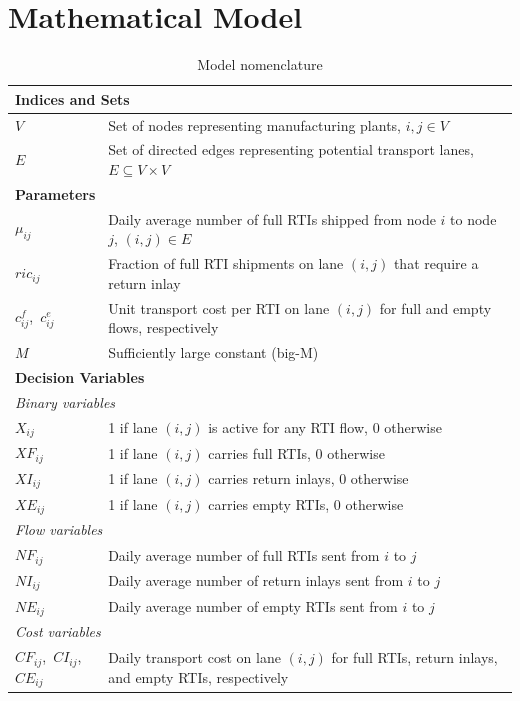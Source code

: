 
\section{Mathematical Model}

\begin{longtable}{|p{}|p{}|}
\caption{Model nomenclature}
\label{tab:nomenclature}\\
\hline
\multicolumn{2}{|l|}{\textbf{Indices and Sets}}\\ \hline
$V$ & Set of nodes representing manufacturing plants, $i, j \in V$ \\
$E$ & Set of directed edges representing potential transport lanes,
      $E \subseteq V \times V$ \\
\hline
\multicolumn{2}{|l|}{\textbf{Parameters}}\\ \hline
$\mu_{ij}$     & Daily average number of full RTIs shipped from node $i$
                 to node $j$, $(i,j)\in E$ \\
$ric_{ij}$     & Fraction of full RTI shipments on lane $(i,j)$ that
                 require a return inlay \\
$c^{f}_{ij}$,\ $c^{e}_{ij}$ & Unit transport cost per RTI on lane $(i,j)$
                 for full and empty flows, respectively \\
$M$            & Sufficiently large constant (big-M) \\
\hline
\multicolumn{2}{|l|}{\textbf{Decision Variables}}\\ \hline
\multicolumn{2}{|l|}{\textit{Binary variables}}\\ \hline
$X_{ij}$  & 1 if lane $(i,j)$ is active for any RTI flow, 0 otherwise \\
$XF_{ij}$ & 1 if lane $(i,j)$ carries full RTIs, 0 otherwise \\
$XI_{ij}$ & 1 if lane $(i,j)$ carries return inlays, 0 otherwise \\
$XE_{ij}$ & 1 if lane $(i,j)$ carries empty RTIs, 0 otherwise \\
\hline
\multicolumn{2}{|l|}{\textit{Flow variables}}\\ \hline
$NF_{ij}$ & Daily average number of full RTIs sent from $i$ to $j$ \\
$NI_{ij}$ & Daily average number of return inlays sent from $i$ to $j$ \\
$NE_{ij}$ & Daily average number of empty RTIs sent from $i$ to $j$ \\
\hline
\multicolumn{2}{|l|}{\textit{Cost variables}}\\ \hline
$CF_{ij}$,\ $CI_{ij}$,\ $CE_{ij}$ & Daily transport cost on lane $(i,j)$
                 for full RTIs, return inlays, and empty RTIs, respectively \\
\hline
\end{longtable}

